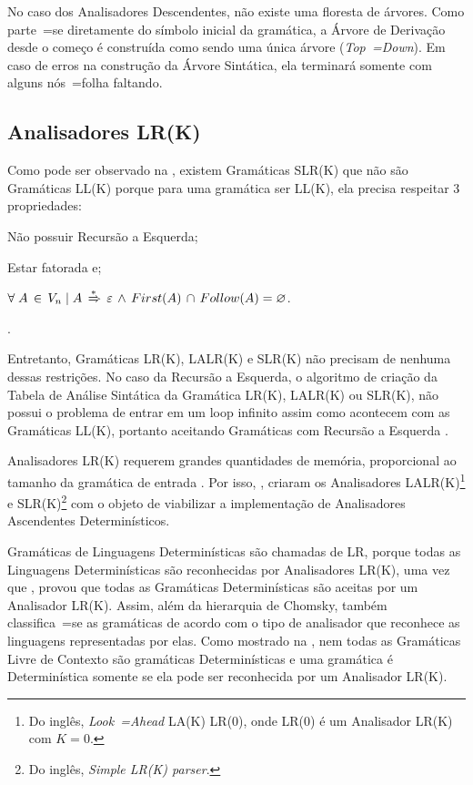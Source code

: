 No caso dos Analisadores Descendentes,
não existe uma floresta de árvores.
Como parte~=se diretamente do símbolo inicial da gramática,
a Árvore de Derivação desde o começo é construída como sendo uma única árvore (\textit{Top~=Down}).
Em caso de erros na construção da Árvore Sintática,
ela terminará somente com alguns nós~=folha faltando.


\subsection{Analisadores LR(K)}

Como pode ser observado na ,
existem Gramáticas SLR(K) que não são Gramáticas LL(K) porque para uma gramática ser LL(K),
ela precisa respeitar 3 propriedades:
\begin{inparaenum}[1)]
    \item Não possuir Recursão a Esquerda;
    \item Estar fatorada e;
    \item $\forall\; A\, \in\, V_n\; |\; A\,
            \xRightarrow{*}\, \varepsilon\,
            \land\, First(A)\, \cap\, Follow(A) = \varnothing$.
\end{inparaenum}%
\cite{ahoCompilerDragonBook}.

Entretanto,
Gramáticas LR(K), LALR(K) e
SLR(K) não precisam de nenhuma dessas restrições.
No caso da Recursão a Esquerda,
o algoritmo de criação da Tabela de Análise Sintática da Gramática LR(K),
LALR(K) ou SLR(K),
não possui o problema de entrar em um loop infinito assim como acontecem com as Gramáticas LL(K),
portanto aceitando Gramáticas com Recursão a Esquerda \cite{ahoCompilerDragonBook}.

Analisadores LR(K) requerem grandes quantidades de memória,
proporcional ao tamanho da gramática de entrada \cite{complexityOfLRKTesting}.
Por isso,
,
criaram os Analisadores LALR(K)\footnote{
Do inglês, \textit{Look~=Ahead} LA(K) LR(0),
onde LR(0) é um Analisador LR(K) com $K=0$.
}
e SLR(K)\footnote{
Do inglês, \textit{Simple LR(K) parser}.
}
com o objeto de viabilizar a implementação de Analisadores Ascendentes Determinísticos.

Gramáticas de Linguagens Determinísticas são chamadas de LR,
porque todas as Linguagens Determinísticas são reconhecidas por Analisadores LR(K),
uma vez que ,
provou que todas as Gramáticas Determinísticas são aceitas por um Analisador LR(K).
Assim,
além da hierarquia de Chomsky,
também classifica~=se as gramáticas de acordo com o tipo de analisador que reconhece as linguagens representadas por elas.
Como mostrado na ,
nem todas as Gramáticas Livre de Contexto são gramáticas Determinísticas e
uma gramática é Determinística somente se ela pode ser reconhecida por um Analisador LR(K).

